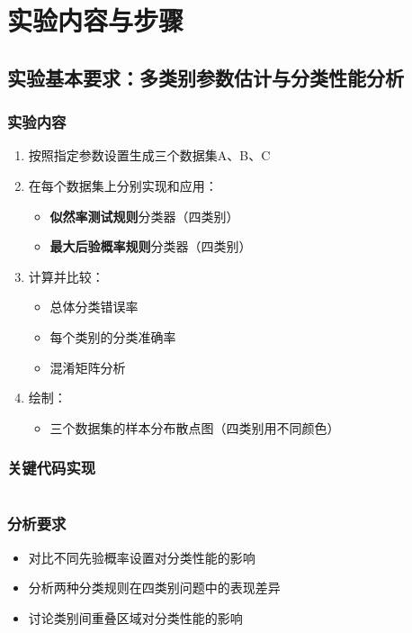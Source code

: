 \documentclass[12pt]{article}
\begin{document}
\section{实验内容与步骤}

\subsection{实验基本要求：多类别参数估计与分类性能分析}

\subsubsection{实验内容}
\begin{enumerate}
    \item 按照指定参数设置生成三个数据集A、B、C
    \item 在每个数据集上分别实现和应用：
    \begin{itemize}
        \item \textbf{似然率测试规则}分类器（四类别）
        \item \textbf{最大后验概率规则}分类器（四类别）
    \end{itemize}
    \item 计算并比较：
    \begin{itemize}
        \item 总体分类错误率
        \item 每个类别的分类准确率
        \item 混淆矩阵分析
    \end{itemize}
    \item 绘制：
    \begin{itemize}
        \item 三个数据集的样本分布散点图（四类别用不同颜色）
    \end{itemize}
\end{enumerate}

\subsubsection{关键代码实现}
\begin{lstlisting}[caption=数据集生成和参数估计分类器代码]

\end{lstlisting}

\subsubsection{分析要求}
\begin{itemize}
    \item 对比不同先验概率设置对分类性能的影响
    \item 分析两种分类规则在四类别问题中的表现差异
    \item 讨论类别间重叠区域对分类性能的影响
\end{itemize}
\end{document}
